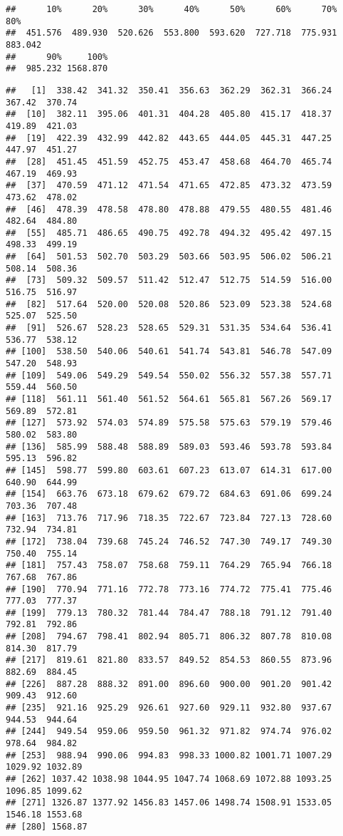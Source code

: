 \documentclass[
]{article}
\newenvironment{Shaded}{\begin{snugshade}}{\end{snugshade}}
\newcommand{\FunctionTok}[1]{\textcolor[rgb]{0.13,0.29,0.53}{\textbf{#1}}}
\newcommand{\NormalTok}[1]{#1}
\newcommand{\SpecialCharTok}[1]{\textcolor[rgb]{0.81,0.36,0.00}{\textbf{#1}}}
\begin{document}
\begin{verbatim}
##      10%      20%      30%      40%      50%      60%      70%      80% 
##  451.576  489.930  520.626  553.800  593.620  727.718  775.931  883.042 
##      90%     100% 
##  985.232 1568.870
\end{verbatim}

\begin{Shaded}
\end{Shaded}

\begin{verbatim}
##   [1]  338.42  341.32  350.41  356.63  362.29  362.31  366.24  367.42  370.74
##  [10]  382.11  395.06  401.31  404.28  405.80  415.17  418.37  419.89  421.03
##  [19]  422.39  432.99  442.82  443.65  444.05  445.31  447.25  447.97  451.27
##  [28]  451.45  451.59  452.75  453.47  458.68  464.70  465.74  467.19  469.93
##  [37]  470.59  471.12  471.54  471.65  472.85  473.32  473.59  473.62  478.02
##  [46]  478.39  478.58  478.80  478.88  479.55  480.55  481.46  482.64  484.80
##  [55]  485.71  486.65  490.75  492.78  494.32  495.42  497.15  498.33  499.19
##  [64]  501.53  502.70  503.29  503.66  503.95  506.02  506.21  508.14  508.36
##  [73]  509.32  509.57  511.42  512.47  512.75  514.59  516.00  516.75  516.97
##  [82]  517.64  520.00  520.08  520.86  523.09  523.38  524.68  525.07  525.50
##  [91]  526.67  528.23  528.65  529.31  531.35  534.64  536.41  536.77  538.12
## [100]  538.50  540.06  540.61  541.74  543.81  546.78  547.09  547.20  548.93
## [109]  549.06  549.29  549.54  550.02  556.32  557.38  557.71  559.44  560.50
## [118]  561.11  561.40  561.52  564.61  565.81  567.26  569.17  569.89  572.81
## [127]  573.92  574.03  574.89  575.58  575.63  579.19  579.46  580.02  583.80
## [136]  585.99  588.48  588.89  589.03  593.46  593.78  593.84  595.13  596.82
## [145]  598.77  599.80  603.61  607.23  613.07  614.31  617.00  640.90  644.99
## [154]  663.76  673.18  679.62  679.72  684.63  691.06  699.24  703.36  707.48
## [163]  713.76  717.96  718.35  722.67  723.84  727.13  728.60  732.94  734.81
## [172]  738.04  739.68  745.24  746.52  747.30  749.17  749.30  750.40  755.14
## [181]  757.43  758.07  758.68  759.11  764.29  765.94  766.18  767.68  767.86
## [190]  770.94  771.16  772.78  773.16  774.72  775.41  775.46  777.03  777.37
## [199]  779.13  780.32  781.44  784.47  788.18  791.12  791.40  792.81  792.86
## [208]  794.67  798.41  802.94  805.71  806.32  807.78  810.08  814.30  817.79
## [217]  819.61  821.80  833.57  849.52  854.53  860.55  873.96  882.69  884.45
## [226]  887.28  888.32  891.00  896.60  900.00  901.20  901.42  909.43  912.60
## [235]  921.16  925.29  926.61  927.60  929.11  932.80  937.67  944.53  944.64
## [244]  949.54  959.06  959.50  961.32  971.82  974.74  976.02  978.64  984.82
## [253]  988.94  990.06  994.83  998.33 1000.82 1001.71 1007.29 1029.92 1032.89
## [262] 1037.42 1038.98 1044.95 1047.74 1068.69 1072.88 1093.25 1096.85 1099.62
## [271] 1326.87 1377.92 1456.83 1457.06 1498.74 1508.91 1533.05 1546.18 1553.68
## [280] 1568.87
\end{verbatim}
\end{document}

